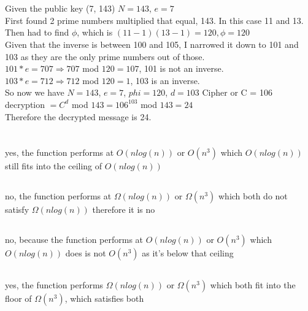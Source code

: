 \documentclass[letterpaper]{article}
\begin{document}
	\section{}
    	Given the public key (7, 143) $N = 143$, $e = 7$\\
        First found 2 prime numbers multiplied that equal, 143.  In this case 11 and 13.\\
        Then had to find $\phi$, which is $(11-1)(13-1) = 120, \phi = 120$\\
		Given that the inverse is between 100 and 105, I narrowed it down to 101 and 103 as they are the only prime numbers out of those.\\
        $101 * e = 707 \Rightarrow 707$ mod $120 = 107$, 101 is not an inverse.\\
        $103 * e = 712 \Rightarrow 712$ mod $120 = 1$, 103 is an inverse.\\
        So now we have $N=143$, $e = 7$, $phi = 120$, $d = 103$ Cipher or C = 106\\
        decryption $= C^d$ mod $143 = 106^103$ mod $143 = 24$\\
        Therefore the decrypted message is 24.
    \section{}
    	\subsection{}
        	yes, the function performs at $O(nlog(n))$ or $O(n^3)$ which $O(nlog(n))$ still fits into the ceiling of $O(nlog(n))$
        \subsection{}
        	no, the function performs at $\Omega(nlog(n))$ or $\Omega(n^3)$ which both do not satisfy $\Omega(nlog(n))$ therefore it is no
        \subsection{}
        	no, because the function performs at $O(nlog(n))$ or $O(n^3)$ which $O(nlog(n))$ does is not $O(n^3)$ as it's below that ceiling
        \subsection{}
        	yes, the function performs $\Omega(nlog(n))$ or $\Omega(n^3)$ which both fit into the floor of $\Omega(n^3)$, which satisfies both
\end{document}
